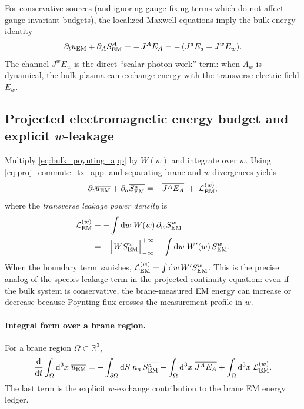 \documentclass[11pt]{article}
\begin{document}
For conservative sources (and ignoring gauge-fixing terms which do not affect gauge-invariant
budgets), the localized Maxwell equations imply the bulk energy identity
\begin{equation}
\partial_t u_{\rm EM}
+
\partial_A S_{\rm EM}^A
=
-\,J^A E_A
=
-\,(J^aE_a + J^wE_w).
\label{eq:bulk_poynting_app}
\end{equation}
The channel \(J^wE_w\) is the direct ``scalar-photon work'' term: when \(A_w\) is dynamical,
the bulk plasma can exchange energy with the transverse electric field \(E_w\).

\subsection{Projected electromagnetic energy budget and explicit \(w\)-leakage}
\label{app:proj_energy_budget}

Multiply \eqref{eq:bulk_poynting_app} by \(W(w)\) and integrate over \(w\). Using
\eqref{eq:proj_commute_tx_app} and separating brane and \(w\) divergences yields
\begin{equation}
\partial_t \overline{u_{\rm EM}}
+
\partial_a \overline{S_{\rm EM}^a}
=
-\overline{J^A E_A}
\;+\;
\mathcal{L}_{\rm EM}^{(w)},
\label{eq:proj_energy_local_app}
\end{equation}
where the \emph{transverse leakage power density} is
\begin{align}
\mathcal{L}_{\rm EM}^{(w)}
&\equiv
-\int\dd w\;W(w)\,\partial_w S_{\rm EM}^w
\nonumber\\
&=
-\Big[W S_{\rm EM}^w\Big]_{-\infty}^{+\infty}
+
\int\dd w\;W'(w)\,S_{\rm EM}^w.
\label{eq:energy_leak_term_app}
\end{align}
When the boundary term vanishes, \(\mathcal{L}_{\rm EM}^{(w)}=\int \dd w\,W' S_{\rm EM}^w\).
This is the precise analog of the species-leakage term in the projected continuity equation:
even if the bulk system is conservative, the brane-measured EM energy can increase or decrease
because Poynting flux crosses the measurement profile in \(w\).

\paragraph{Integral form over a brane region.}
For a brane region \(\Omega\subset\mathbb{R}^3\),
\begin{equation}
\frac{\dd}{\dd t}\int_{\Omega}\dd^3x\;\overline{u_{\rm EM}}
=
-\int_{\partial\Omega}\dd S\;n_a\,\overline{S_{\rm EM}^a}
-\int_{\Omega}\dd^3x\;\overline{J^A E_A}
+\int_{\Omega}\dd^3x\;\mathcal{L}_{\rm EM}^{(w)}.
\label{eq:energy_integral_brane_app}
\end{equation}
The last term is the explicit \(w\)-exchange contribution to the brane EM energy ledger.
\end{document}
